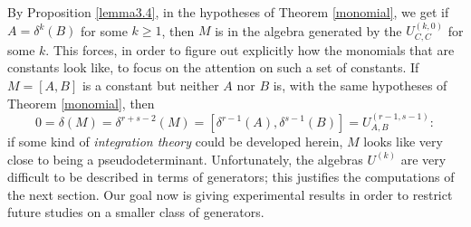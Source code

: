 \documentclass{cimart}
\begin{document}
\begin{remark}By Proposition \ref{lemma3.4}, in the hypotheses of Theorem \ref{monomial}, we get if $A=\delta^k(B)$ for some $k\geq1$, then $M$ is in the algebra generated by the $ U_{C,C}^{(k, 0)}$ for some $k$. This forces, in order to figure out explicitly how the monomials that are constants look like, to focus on the attention on such a set of constants. If $M=[A,B]$ is a constant but neither $A$ nor $B$ is, with the same hypotheses of Theorem \ref{monomial}, then \[0 = \delta(M)= \delta^{r+ s - 2}(M) = [\delta^{r-1}(A),\delta^{s-1}(B)]=U_{A,B}^{(r-1,s-1)}:\] if some kind of \textit{integration theory} could be developed herein, $M$ looks like very close to being a pseudodeterminant. Unfortunately, the algebras $U^{(k)}$ are very difficult to be described in terms of generators; this justifies the computations of the next section. Our goal now is giving experimental results in order to restrict future studies on a smaller class of generators.
\end{remark}




\end{document}
